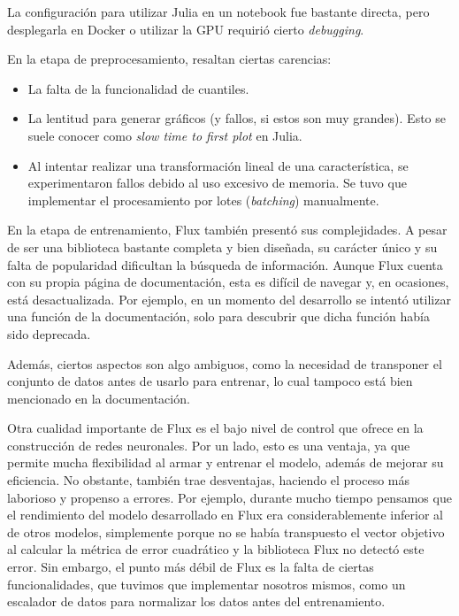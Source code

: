 \documentclass[11pt]{article}
\newcommand{\english}[1]{\textit{#1}}
\begin{document}
La configuración para utilizar Julia en un notebook fue bastante directa, pero desplegarla en Docker o utilizar la GPU requirió cierto \english{debugging}.

En la etapa de preprocesamiento, resaltan ciertas carencias:

\begin{itemize}
    \item La falta de la funcionalidad de cuantiles.
    \item La lentitud para generar gráficos (y fallos, si estos son muy grandes). Esto se suele conocer como \english{slow time to first plot} \cite{jl:ex:slow_time_first_plot} en Julia.
    \item Al intentar realizar una transformación lineal de una característica, se experimentaron fallos debido al uso excesivo de memoria. Se tuvo que implementar el procesamiento por lotes (\english{batching}) manualmente.
\end{itemize}

En la etapa de entrenamiento, Flux también presentó sus complejidades. A pesar de ser una biblioteca bastante completa y bien diseñada, su carácter único y su falta de popularidad dificultan la búsqueda de información. Aunque Flux cuenta con su propia página de documentación, esta es difícil de navegar y, en ocasiones, está desactualizada. Por ejemplo, en un momento del desarrollo se intentó utilizar una función de la documentación, solo para descubrir que dicha función había sido deprecada.

Además, ciertos aspectos son algo ambiguos, como la necesidad de transponer el conjunto de datos antes de usarlo para entrenar, lo cual tampoco está bien mencionado en la documentación.

Otra cualidad importante de Flux es el bajo nivel de control que ofrece en la construcción de redes neuronales. Por un lado, esto es una ventaja, ya que permite mucha flexibilidad al armar y entrenar el modelo, además de mejorar su eficiencia. No obstante, también trae desventajas, haciendo el proceso más laborioso y propenso a errores. Por ejemplo, durante mucho tiempo pensamos que el rendimiento del modelo desarrollado en Flux era considerablemente inferior al de otros modelos, simplemente porque no se había transpuesto el vector objetivo al calcular la métrica de error cuadrático y la biblioteca Flux no detectó este error. Sin embargo, el punto más débil de Flux es la falta de ciertas funcionalidades, que tuvimos que implementar nosotros mismos, como un escalador de datos para normalizar los datos antes del entrenamiento.
\end{document}

